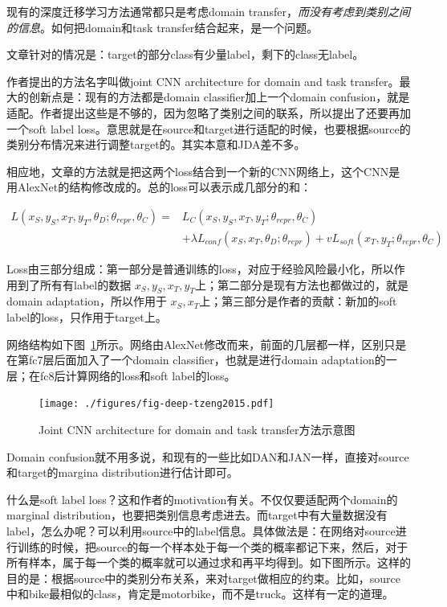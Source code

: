 现有的深度迁移学习方法通常都只是考虑domain transfer，\textit{而没有考虑到类别之间的信息}。如何把domain和task transfer结合起来，是一个问题。

文章针对的情况是：target的部分class有少量label，剩下的class无label。

作者提出的方法名字叫做joint CNN architecture for domain and task transfer。最大的创新点是：现有的方法都是domain classifier加上一个domain confusion，就是适配。作者提出这些是不够的，因为忽略了类别之间的联系，所以提出了还要再加一个soft label loss。意思就是在source和target进行适配的时候，也要根据source的类别分布情况来进行调整target的。其实本意和JDA差不多。

相应地，文章的方法就是把这两个loss结合到一个新的CNN网络上，这个CNN是用AlexNet的结构修改成的。总的loss可以表示成几部分的和：

\begin{equation}
\begin{split}
L(x_S,y_S,x_T,y_T,\theta_D;\theta_{repr},\theta_C)=&L_C(x_S,y_S,x_T,y_T;\theta_{repr},\theta_C)\\
&+\lambda L_{conf}(x_S,x_T,\theta_D;\theta_{repr})+v L_{soft}(x_T,y_T;\theta_{repr},\theta_C)
\end{split}
\end{equation}

Loss由三部分组成：第一部分是普通训练的loss，对应于经验风险最小化，所以作用到了所有有label的数据 $x_S,y_S,x_T,y_T$上；第二部分是现有方法也都做过的，就是domain adaptation，所以作用于 $x_S,x_T$上；第三部分是作者的贡献：新加的soft label的loss，只作用于target上。

网络结构如下图~\ref{fig-deep-tzeng2015}所示。网络由AlexNet修改而来，前面的几层都一样，区别只是在第fc7层后面加入了一个domain classifier，也就是进行domain adaptation的一层；在fc8后计算网络的loss和soft label的loss。

\begin{figure}[htbp]
	\centering
	\texttt{[image: ./figures/fig-deep-tzeng2015.pdf]}
	\caption{Joint CNN architecture for domain and task transfer方法示意图}
	\label{fig-deep-tzeng2015}
\end{figure}

Domain confusion就不用多说，和现有的一些比如DAN和JAN一样，直接对source和target的margina distribution进行估计即可。

什么是soft label loss？这和作者的motivation有关。不仅仅要适配两个domain的marginal distribution，也要把类别信息考虑进去。而target中有大量数据没有label，怎么办呢？可以利用source中的label信息。具体做法是：在网络对source进行训练的时候，把source的每一个样本处于每一个类的概率都记下来，然后，对于所有样本，属于每一个类的概率就可以通过求和再平均得到。如下图所示。这样的目的是：根据source中的类别分布关系，来对target做相应的约束。比如，source中和bike最相似的class，肯定是motorbike，而不是truck。这样有一定的道理。

